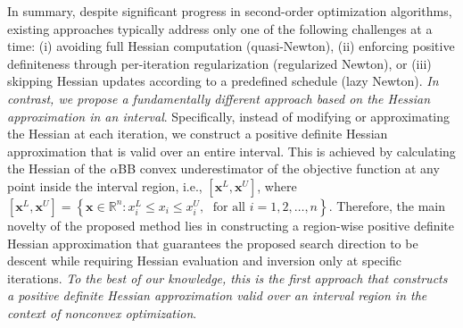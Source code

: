 \documentclass{elsarticle}
\numberwithin{equation}{section}
\begin{document}
{ In summary, despite significant progress in second-order optimization algorithms, existing approaches typically address only one of the following challenges at a time: (i) avoiding full Hessian computation (quasi-Newton), (ii) enforcing positive definiteness through per-iteration regularization (regularized Newton), or (iii) skipping Hessian updates according to a predefined schedule (lazy Newton). \textit{In contrast, we propose a fundamentally different approach based on the Hessian approximation in an interval}. Specifically, instead of modifying or approximating the Hessian at each iteration, we construct a positive definite Hessian approximation that is valid over an entire interval.  This is achieved by calculating the Hessian of the $\alpha$BB convex underestimator \cite{adjiman1998global2} of the objective function at any point inside the interval region, i.e., $[\mathbf{x}^L, \mathbf{x}^U]$, where $
[\mathbf{x}^L, \mathbf{x}^U]
=
\left\{
\mathbf{x} \in \mathbb{R}^n : 
x_i^L \le x_i \le x_i^U,\; \text{ for all } i = 1,2, \ldots, n
\right\}
$. Therefore, the main novelty of the proposed method lies in constructing a region-wise positive definite Hessian approximation that guarantees the proposed search direction to be descent while requiring Hessian evaluation and inversion only at specific iterations. \textit{To the best of our knowledge, this is the first approach that constructs a positive definite Hessian approximation valid over an interval region in the context of nonconvex optimization}. 
}  
\end{document}
